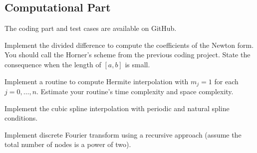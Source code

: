 \subsection{Computational Part}
The coding part and test cases are available on GitHub. 
\begin{problem}
    Implement the divided difference to compute the coefficients of the Newton form. You should call the Horner's scheme from the previous coding project. State the consequence when the length of $[a, b]$ is small. 
\end{problem}
\begin{problem}
    Implement a routine to compute Hermite interpolation with $m_j = 1$ for each $j = 0, \dots, n$. Estimate your routine's time complexity and space complexity. 
\end{problem}
\begin{problem}
    Implement the cubic spline interpolation with periodic and natural spline conditions. 
\end{problem}

\begin{problem}
     Implement discrete Fourier transform using a recursive approach (assume the total number of nodes is a power of two).
\end{problem}

% 
\nocite{jackson1912approximation, jackson1913accuracy, erdHos1964problems,erdos1958problems,de1978practical,prenter2008splines}


